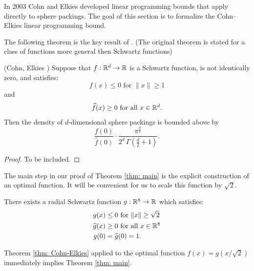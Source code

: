   In 2003 Cohn and Elkies \cite{ElkiesCohn}  developed  linear programming bounds that apply directly to sphere packings. The goal of this section is to formalize the Cohn--Elkies linear programming bound.

  The following theorem is the key result of \cite{ElkiesCohn}. (The original theorem is stated for a   class of functions more general then Schwartz functions)
  \begin{theorem}\label{thm: Cohn-Elkies}
  (Cohn, Elkies \cite{ElkiesCohn}) Suppose that  $f:\mathbb{R}^d\to\mathbb{R}$ is a Schwartz function, is not identically zero, and satisfies:
  \begin{equation}\label{eqn: Cohn-Elkies condition 1}f(x)\leq 0\mbox{ for } \|x\|\geq 1\end{equation} and
  \begin{equation}\label{eqn: Cohn-Elkies condition 2}\widehat{f}(x)\geq0\mbox{ for all } x\in\mathbb{R}^d.\end{equation}
   Then the  density of  $d$-dimensional
   sphere packings is bounded above by $$\frac{f(0)}{\widehat{f}(0)}\cdot \frac{\pi^{\frac{d}{2}}}{2^d\,\Gamma(\textstyle \frac{d}{2}+1)}.$$
  \end{theorem}
  \begin{proof}
  To be included.
  \end{proof}


   The main step in our proof of Theorem \ref{thm: main} is the explicit  construction of an optimal function. It will be convenient for us to scale this function by $\sqrt{2}$.
  \begin{theorem}\label{thm: g}
  There exists a radial Schwartz function $g:\mathbb{R}^8\to\mathbb{R}$ which satisfies:
  \begin{align}
  g(x)&\leq 0\mbox{ for } \|x\|\geq \sqrt{2} \label{eqn: g1}\\
  \widehat{g}(x)&\geq0\mbox{ for all } x\in\mathbb{R}^8\label{eqn: g2}\\
  g(0)&=\widehat{g}(0)=1.\label{eqn: g3}
  \end{align}
  \end{theorem}
  Theorem \ref{thm: Cohn-Elkies} applied to the optimal function $f(x)=g(x/\sqrt{2})$ immediately implies Theorem \ref{thm: main}.



